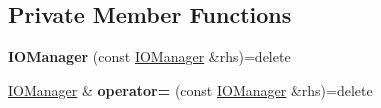 \subsection*{Private Member Functions}
\begin{DoxyCompactItemize}
\item 
{\bfseries I\+O\+Manager} (const \hyperlink{classimage__tools_1_1IOManager}{I\+O\+Manager} \&rhs)=delete\hypertarget{classimage__tools_1_1IOManager_a3d4afeda268cd5f55994c5c055dcb50f}{}\label{classimage__tools_1_1IOManager_a3d4afeda268cd5f55994c5c055dcb50f}

\item 
\hyperlink{classimage__tools_1_1IOManager}{I\+O\+Manager} \& {\bfseries operator=} (const \hyperlink{classimage__tools_1_1IOManager}{I\+O\+Manager} \&rhs)=delete\hypertarget{classimage__tools_1_1IOManager_ab51c42c7007e4fa4da32a943c4beed42}{}\label{classimage__tools_1_1IOManager_ab51c42c7007e4fa4da32a943c4beed42}

\end{DoxyCompactItemize}
